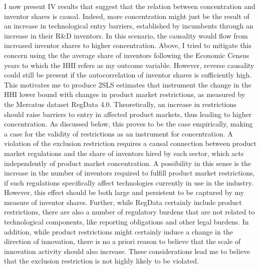 I now present IV results that suggest that the relation between concentration
and inventor shares is causal. Indeed, more concentration might just
be the result of an increase in technological entry barriers, established
by incumbents through an increase in their R\&D inventors. In this
scenario, the causality would flow from increased inventor shares
to higher concentration. Above, I tried to mitigate this concern using
the the average share of inventors following the Economic Census years
to which the HHI refers as my outcome variable. However, reverse causality
could still be present if the autocorrelation of inventor shares is
sufficiently high. This motivates me to produce 2SLS estimates that
instrument the change in the HHI lower bound with changes in product
market restrictions, as measured by the Mercatus dataset RegData 4.0.
Theoretically, an increase in restrictions should raise barriers to
entry in affected product markets, thus leading to higher concentration.
As discussed below, this proves to be the case empirically, making
a case for the validity of restrictions as an instrument for concentration.
A violation of the exclusion restriction requires a causal connection
between product market regulations and the share of inventors hired
by each sector, which acts independently of product market concentration.
A possibility in this sense is the increase in the number of inventors
required to fulfill product market restrictions, if such regulations
specifically affect technologies currently in use in the industry.
However, this effect should be both large and persistent to be captured
by my measure of inventor shares. Further, while RegData certainly
include product restrictions, there are also a number of regulatory
burdens that are not related to technological components, like reporting
obligations and other legal burdens. In addition, while product restrictions
might certainly induce a change in the direction of innovation, there
is no a priori reason to believe that the scale of innovation activity
should also increase. These considerations lead me to believe that
the exclusion restriction is not highly likely to be violated.

